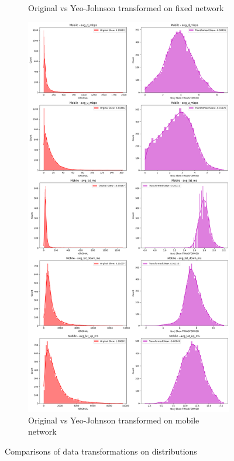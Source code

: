 \documentclass[
  letterpaper,
  DIV=11,
  numbers=noendperiod,
  oneside]{scrartcl}
\begin{document}
\begin{figure}
{\begin{figure}[H]
{}

\caption{Original vs Yeo-Johnson transformed on fixed network}

\end{figure}

\begin{figure}[H]

{\centering \includegraphics{data-analytics_files/figure-latex/fig-transcomp-output-8.png}

}

\caption{Original vs Yeo-Johnson transformed on mobile network}

\end{figure}

}

\caption{\label{fig-transcomp}Comparisons of data transformations on
distributions}

\end{figure}
\end{document}
